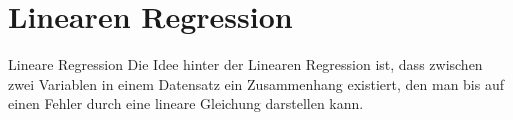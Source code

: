 \section{Linearen Regression}
\begin{frame}{Lineare Regression}
    Die Idee hinter der Linearen Regression ist, dass zwischen zwei Variablen in einem Datensatz ein Zusammenhang existiert, den man bis auf einen Fehler durch eine lineare Gleichung darstellen kann.

\end{frame}
